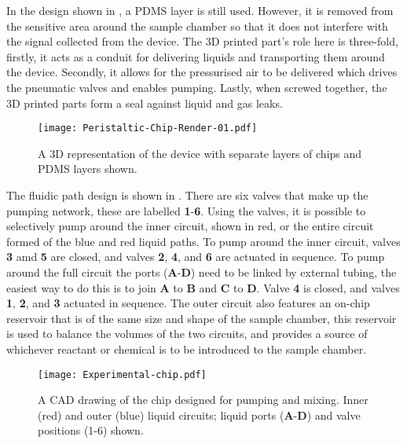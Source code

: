 In the design shown in , a PDMS layer is still used. However, it is removed from the
sensitive area around the sample chamber so that it does not interfere with the signal
collected from the device. The 3D printed part's role here is three-fold, firstly, it acts
as a conduit for delivering liquids and transporting them around the device. Secondly, it
allows for the pressurised air to be delivered which drives the pneumatic valves and
enables pumping. Lastly, when screwed together, the 3D printed parts form a seal against
liquid and gas leaks.

\begin{figure}[ht]
  \begin{center}
  \texttt{[image: Peristaltic-Chip-Render-01.pdf]}
  \caption{A 3D representation of the device with separate layers of chips and PDMS
  layers shown.}
  \label{fig:3Ddevice}
  \end{center}
\end{figure}

The fluidic path design is shown in . There are six valves that make up the pumping network,
these are labelled \textbf{1}-\textbf{6}. Using the valves, it is possible to selectively pump around the inner circuit,
shown in red, or the entire circuit formed of the blue and red liquid paths. To pump around the inner circuit, valves \textbf{3}
amd \textbf{5} are closed, and valves \textbf{2}, \textbf{4}, and \textbf{6} are actuated in sequence. To pump around the full
circuit the ports (\textbf{A}-\textbf{D}) need to be linked by external tubing, the easiest way to do this is to join \textbf{A} to
\textbf{B} and \textbf{C} to \textbf{D}. Valve \textbf{4} is closed, and valves \textbf{1}, \textbf{2}, and \textbf{3} actuated in sequence.
The outer circuit also features an on-chip reservoir that is of the same size and shape of the sample chamber, this reservoir is used to
balance the volumes of the two circuits, and provides a source of whichever reactant or chemical is to be introduced to
the sample chamber.

\begin{figure}[ht]
  \begin{center}
  \texttt{[image: Experimental-chip.pdf]}
  \caption{A CAD drawing of the chip designed for pumping and mixing. Inner (red) and outer (blue) liquid circuits; liquid ports (\textbf{A}-\textbf{D}) and valve positions (1-6) shown.}
  \label{fig:Chip}
  \end{center}
\end{figure}

